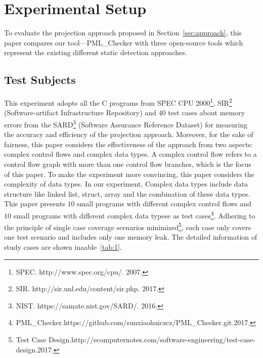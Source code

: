 \section{Experimental Setup}\label{sec:setup}
To evaluate the projection approach proposed in Section~\ref{sec:approach}, 
this paper compares our tool---PML\_Checker with three open-source tools which represent the existing different static detection approaches. 

\subsection{Test Subjects}\label{ssec:ts}
This experiment adopts all the C programs from SPEC CPU 2000\footnote{SPEC. http://www.spec.org/cpu/. 2007.}, SIR\footnote{SIR. http://sir.unl.edu/content/sir.php. 2017.} (Software-artifact Infrastructure Repository) and $40$ test cases about memory errors from the SARD\footnote{NIST. https://samate.nist.gov/SARD/. 2016.} (Software Assurance Reference Dataset) for measuring the accuracy and efficiency of the projection approach. Moreover, for the sake of fairness, this paper considers the effectiveness of the approach from two aspects: complex control flows and complex data types. A complex control flow refers to a control flow graph with more than one control flow branches, which is the focus of this paper. To make the experiment more convincing, this paper considers the complexity of data types. In our experiment, Complex data types include data structure like linked list, struct, array and the combination of these data types. This paper presents $10$ small programs with different complex control flows and $10$ small programs with different complex data typese as test cases\protect\footnote{PML\_Checker.https://github.com/sunxiaohuiczcz/PML\_Checker.git.2017.}. Adhering to the principle of single case coverage scenarios minimized\footnote{Test Case Design.http://ecomputernotes.com/software-engineering/test-case-design.2017.}, each case only covers one test scenario and includes only one memory leak.
The detailed information of study cases are shown inaable~\ref{tab:1}.
%

